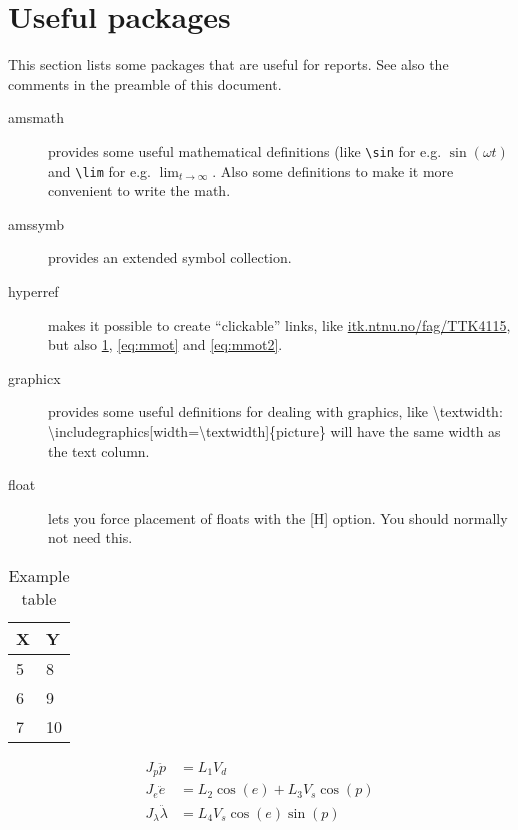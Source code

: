 \section{Useful packages}
This section lists some packages that are useful for reports. See also the comments in the preamble of this document.

\begin{description}
  \item[amsmath] provides some useful mathematical definitions (like \texttt{\textbackslash{sin}} for e.g. $\sin(\omega t)$ and \texttt{\textbackslash{lim}} for e.g. $\lim_{t\to\infty}$. Also some definitions to make it more convenient to write the math.
  \item[amssymb] provides an extended symbol collection.
  \item[hyperref] makes it possible to create ``clickable'' links, like \url{itk.ntnu.no/fag/TTK4115}, but also \cref{tab:extab}, \cref{eq:mmot} and \cref{eq:mmot2}.
  \item[graphicx] provides some useful definitions for dealing with graphics, like \textbackslash{textwidth}: \textbackslash{includegraphics}[width=\textbackslash{textwidth}]\{picture\} will have the same width as the text column.
  \item[float] lets you force placement of floats with the [H] option. You should normally not need this.
\end{description}
\begin{table}
  \caption{Example table}
  \centering
  \begin{tabular}{ll}
    \hline
    \textbf{X} & \textbf{Y}\\
    \hline
    5 & 8\\
    6 & 9\\
    7 & 10 \\
    \hline
  \end{tabular}
  \label{tab:extab}
\end{table}

\begin{subequations}
  \begin{align}
    J_p\ddot{p} &= L_{1}V_{d} \label{eq:mmot1}\\
    J_e\ddot{e} &= L_{2} \cos(e) + L_3 V_s \cos(p) \label{eq:mmot2}\\
    J_\lambda \ddot{\lambda} &= L_4 V_s \cos(e) \sin(p) \label{eq:mmot3}
  \end{align}
  \label{eq:mmot}
\end{subequations}

